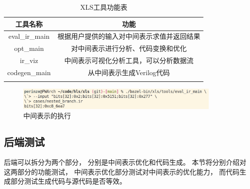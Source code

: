 \begin{table}[ht]
\begin{center}
\caption{XLS工具功能表}

\begin{tabular}{ c c }
    \Xhline{3\arrayrulewidth}
    工具名称              & 功能 \\
    \hline
    eval\_ir\_main       & 根据用户提供的输入对中间表示求值并返回结果 \\
    opt\_main            & 对中间表示进行分析、代码变换和优化 \\
    ir\_viz              & 中间表示可视化分析工具，可以分析数据流 \\
    codegen\_main        & 从中间表示生成Verilog代码 \\
    \Xhline{3\arrayrulewidth}
\end{tabular}

\label{table.5}
\end{center}
\end{table}

\begin{figure}[h]
\centering
\includegraphics[width=0.9\textwidth]{figure/eval_ir_command.png}
\caption{中间表示的执行}
\label{fig.6}
\end{figure}

\subsection{后端测试}



后端可以拆分为两个部分，
分别是中间表示优化和代码生成。
本节将分别介绍对这两部分的功能测试，
中间表示优化部分测试对中间表示的优化能力，
而代码生成部分测试生成代码与源代码是否等效。

